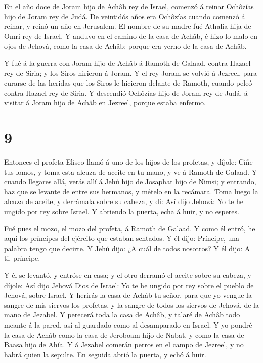  En el año doce de Joram hijo de Achâb rey de Israel,
comenzó á reinar Ochôzías hijo de Joram rey de Judá.  De
veintidós años era Ochôzías cuando comenzó á reinar, y reinó un año en
Jerusalem. El nombre de su madre fué Athalía hija de Omri rey de Israel.
 Y anduvo en el camino de la casa de Achâb, é hizo lo malo
en ojos de Jehová, como la casa de Achâb: porque era yerno de la casa de
Achâb.

 Y fué á la guerra con Joram hijo de Achâb á Ramoth de
Galaad, contra Hazael rey de Siria; y los Siros hirieron á Joram.
 Y el rey Joram se volvió á Jezreel, para curarse de las
heridas que los Siros le hicieron delante de Ramoth, cuando peleó contra
Hazael rey de Siria. Y descendió Ochôzías hijo de Joram rey de Judá, á
visitar á Joram hijo de Achâb en Jezreel, porque estaba enfermo.

\hypertarget{section-8}{%
\section{9}\label{section-8}}

 Entonces el profeta Eliseo llamó á uno de los hijos de los
profetas, y díjole: Ciñe tus lomos, y toma esta alcuza de aceite en tu
mano, y ve á Ramoth de Galaad.  Y cuando llegares allá,
verás allí á Jehú hijo de Josaphat hijo de Nimsi; y entrando, haz que se
levante de entre sus hermanos, y mételo en la recámara. 
Toma luego la alcuza de aceite, y derrámala sobre su cabeza, y di: Así
dijo Jehová: Yo te he ungido por rey sobre Israel. Y abriendo la puerta,
echa á huir, y no esperes.

 Fué pues el mozo, el mozo del profeta, á Ramoth de Galaad.
 Y como él entró, he aquí los príncipes del ejército que
estaban sentados. Y él dijo: Príncipe, una palabra tengo que decirte. Y
Jehú dijo: ¿A cuál de todos nosotros? Y él dijo: A ti, príncipe.

 Y él se levantó, y entróse en casa; y el otro derramó el
aceite sobre su cabeza, y díjole: Así dijo Jehová Dios de Israel: Yo te
he ungido por rey sobre el pueblo de Jehová, sobre Israel. 
Y herirás la casa de Achâb tu señor, para que yo vengue la sangre de mis
siervos los profetas, y la sangre de todos los siervos de Jehová, de la
mano de Jezabel.  Y perecerá toda la casa de Achâb, y talaré
de Achâb todo meante á la pared, así al guardado como al desamparado en
Israel.  Y yo pondré la casa de Achâb como la casa de
Jeroboam hijo de Nabat, y como la casa de Baasa hijo de Ahía.
 Y á Jezabel comerán perros en el campo de Jezreel, y no
habrá quien la sepulte. En seguida abrió la puerta, y echó á huir.

